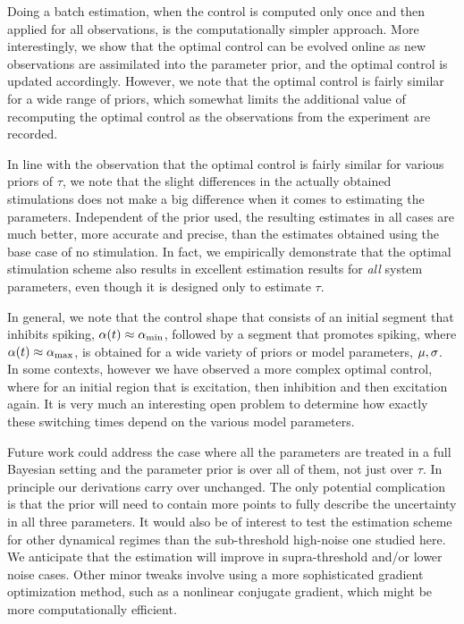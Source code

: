 \documentclass[12pt]{article}
\begin{document}
Doing a batch estimation, when the control is computed only once and then
applied for all observations, is the computationally simpler approach. More
interestingly, we show that the optimal control can be evolved online as
new observations are assimilated into the parameter prior, and the optimal
control is updated accordingly. However, we note that the optimal control is
fairly similar for a wide range of priors, which somewhat limits the
additional value of recomputing the optimal control as the observations from
the experiment are recorded.

In line with the observation that the optimal control is fairly similar for
various priors of $\tau$, we note that the slight differences in the actually
obtained stimulations does not make a big difference when it comes to estimating
the parameters. Independent of the prior used, the resulting
estimates in all cases are much better, more accurate and precise, than the
estimates obtained using the base case of no stimulation. 
In fact, we empirically demonstrate that the optimal stimulation scheme also
results in excellent estimation results for {\sl all} system parameters, even
though it is designed only to estimate $\tau$.

In general, we note that the control shape that consists of an initial segment
that inhibits spiking, ${\alpha}(t) \approx { {\alpha}_{\textrm{min}} }$, followed by a segment that
promotes spiking, where ${\alpha}(t) \approx { {\alpha}_{\textrm{max}} }$, is obtained for a wide variety of
priors or model parameters, ${\mu }, {\sigma }$. In some contexts, however we have observed
a more complex optimal control, where  for an initial region that is excitation,
then inhibition and then excitation again. It is very much an interesting open
problem to determine how exactly these switching times depend on the various
model parameters.

Future work could address the case where all the parameters are treated
in a full Bayesian setting and the parameter prior is over all of them, not just
over $\tau$. In principle our derivations carry over unchanged. The only potential 
complication is that the prior will need to contain more points to fully
describe the uncertainty in all three parameters. It would also be of interest to test the estimation scheme 
for other dynamical regimes than the sub-threshold high-noise one studied here. We anticipate that
the estimation will improve in supra-threshold and/or lower noise cases. 
Other minor tweaks involve using a more sophisticated gradient optimization
method, such as a nonlinear conjugate gradient, which might be more
computationally efficient. 
\end{document}
